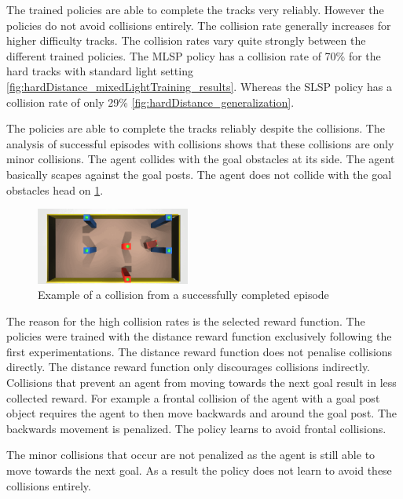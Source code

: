 The trained policies are able to complete the tracks very reliably. However the policies do not avoid collisions entirely. The collision rate generally increases for higher difficulty tracks. The collision rates vary quite strongly between the different trained policies. The \ac{MLSP} policy has a collision rate of 70\% for the hard tracks with standard light setting \ref{fig:hardDistance_mixedLightTraining_results}. Whereas the \ac{SLSP} policy has a collision rate of only 29\% \ref{fig:hardDistance_generalization}.

The policies are able to complete the tracks reliably despite the collisions. The analysis of successful episodes with collisions shows that these collisions are only minor collisions. The agent collides with the goal obstacles at its side. The agent basically scapes against the goal posts. The agent does not collide with the goal obstacles head on \ref{fig:example_collision_success}.

\begin{figure}
    \centering
    \includegraphics[width=0.45\textwidth]{Bilder/example_minor_collision_topview_frame_1295.png}
    \caption{Example of a collision from a successfully completed episode}
    \label{fig:example_collision_success}
\end{figure}

The reason for the high collision rates is the selected reward function. The policies were trained with the distance reward function exclusively following the first experimentations. The distance reward function does not penalise collisions directly. The distance reward function only discourages collisions indirectly. Collisions that prevent an agent from moving towards the next goal result in less collected reward. For example a frontal collision of the agent with a goal post object requires the agent to then move backwards and around the goal post. The backwards movement is penalized. The policy learns to avoid frontal collisions.

The minor collisions that occur are not penalized as the agent is still able to move towards the next goal. As a result the policy does not learn to avoid these collisions entirely.


